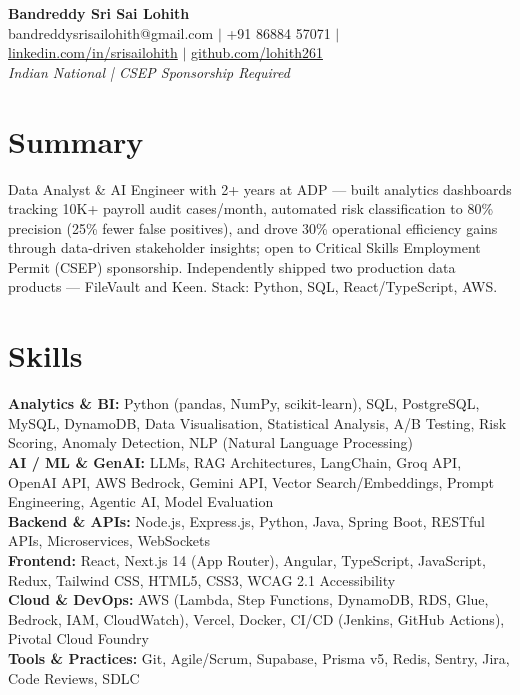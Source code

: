 \documentclass[10pt,letterpaper]{article}
\newcommand{\skillrow}[2]{\textbf{#1:} #2 \\[1pt]}
\begin{document}
\begin{center}
  {\Huge\bfseries Bandreddy Sri Sai Lohith}\\[3pt]
  \small bandreddysrisailohith@gmail.com $\vert$\; +91 86884 57071 $\vert$\; \href{https://linkedin.com/in/srisailohith}{linkedin.com/in/srisailohith} $\vert$\; \href{https://github.com/lohith261}{github.com/lohith261} \\[2pt]
  \small\textit{Indian National | CSEP Sponsorship Required}
\end{center}

\section{Summary}

Data Analyst \& AI Engineer with 2+ years at ADP --- built analytics dashboards tracking 10K+ payroll audit cases/month, automated risk classification to 80\% precision (25\% fewer false positives), and drove 30\% operational efficiency gains through data-driven stakeholder insights; open to Critical Skills Employment Permit (CSEP) sponsorship.
      Independently shipped two production data products --- FileVault and Keen. Stack: Python, SQL, React/TypeScript, AWS.

\section{Skills}

\skillrow{Analytics \& BI}{Python (pandas, NumPy, scikit-learn), SQL, PostgreSQL, MySQL, DynamoDB, Data Visualisation, Statistical Analysis, A/B Testing, Risk Scoring, Anomaly Detection, NLP (Natural Language Processing)}
\skillrow{AI / ML \& GenAI}{LLMs, RAG Architectures, LangChain, Groq API, OpenAI API, AWS Bedrock, Gemini API, Vector Search/Embeddings, Prompt Engineering, Agentic AI, Model Evaluation}
\skillrow{Backend \& APIs}{Node.js, Express.js, Python, Java, Spring Boot, RESTful APIs, Microservices, WebSockets}
\skillrow{Frontend}{React, Next.js 14 (App Router), Angular, TypeScript, JavaScript, Redux, Tailwind CSS, HTML5, CSS3, WCAG 2.1 Accessibility}
\skillrow{Cloud \& DevOps}{AWS (Lambda, Step Functions, DynamoDB, RDS, Glue, Bedrock, IAM, CloudWatch), Vercel, Docker, CI/CD (Jenkins, GitHub Actions), Pivotal Cloud Foundry}
\skillrow{Tools \& Practices}{Git, Agile/Scrum, Supabase, Prisma v5, Redis, Sentry, Jira, Code Reviews, SDLC}
\end{document}
